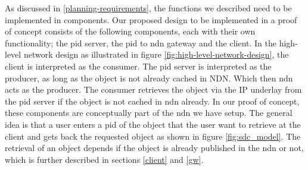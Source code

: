 
As discussed in \ref{planning-requirements}, the functions we described need to be implemented in components. Our proposed design to be implemented in a proof of concept consists of the following components, each with their own functionality; the \gls{pid} server, the \gls{pid} to \gls{ndn} gateway and the client. In the high-level network design as illustrated in figure \ref{fig:high-level-network-design}, the client is interpreted as the consumer. The \gls{pid} server is interpreted as the producer, as long as the object is not already cached in NDN. Which then \gls{ndn} acts as the producer. The consumer retrieves the object via the IP underlay from the \gls{pid} server if the object is not cached in \gls{ndn} already. In our proof of concept, these components are conceptually part of the \gls{ndn} we have setup. The general idea is that a user enters a \gls{pid} of the object that the user want to retrieve at the client and gets back the requested object as shown in figure \ref{fig:sdc_model}. The retrieval of an object depends if the object is already published in the \gls{ndn} or not, which is further described in sections \ref{client} and \ref{gw}.



 

